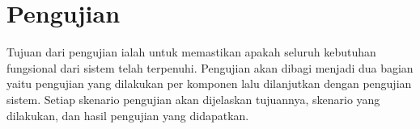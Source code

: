\section{Pengujian}


Tujuan dari pengujian ialah untuk memastikan apakah seluruh kebutuhan fungsional dari sistem telah terpenuhi.
Pengujian akan dibagi menjadi dua bagian yaitu pengujian yang dilakukan per komponen lalu dilanjutkan dengan pengujian sistem. Setiap skenario pengujian akan dijelaskan tujuannya, skenario yang dilakukan, dan hasil pengujian yang didapatkan.








